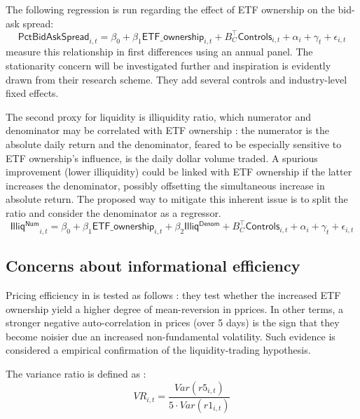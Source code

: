 The following regression is run regarding the effect of ETF ownership on the bid-ask spread:
\begin{equation}
 \mathsf{PctBidAskSpread}_{i,t} = \beta_{0} + \beta_{1} \mathsf{ETF\_ownership}_{i, t} + B_{C}^{\intercal} \mathsf{Controls}_{i, t} + \alpha_{i} + \gamma_{t} + \epsilon_{i, t}
\end{equation}
\textcite{Israeli2017} measure this relationship in first differences using an annual panel. The stationarity concern will be investigated further and inspiration is evidently drawn from their research scheme. They add several controls and industry-level fixed effects.

The second proxy for liquidity is \textcite{Amihud2002} illiquidity ratio, which numerator and denominator may be correlated with ETF ownership : the numerator is the absolute daily return and the denominator, feared to be especially sensitive to ETF ownership's influence, is the daily dollar volume traded. A spurious improvement (lower illiquidity) could be linked with ETF ownership if the latter increases the denominator, possibly offsetting the simultaneous increase in absolute return. The proposed way to mitigate this inherent issue is to split the ratio and consider the denominator as a regressor.
\begin{equation}
   \mathsf{Illiq^{Num}}_{i,t} = \beta_{0} + \beta_{1} \mathsf{ETF\_ownership}_{i, t} + \beta_{2} \mathsf{Illiq^{Denom}} + B_{C}^{\intercal} \mathsf{Controls}_{i, t} + \alpha_{i} + \gamma_{t} + \epsilon_{i, t}
\end{equation}
\subsection{Concerns about informational efficiency}
\label{subsec:Method:Efficiency}
Pricing efficiency in \textcite{Ben-David2018} is tested as follows : they test whether the increased ETF ownership yield a higher degree of mean-reversion in pprices. In other terms, a stronger negative auto-correlation in prices (over 5 days) is the sign that they become noisier due an increased non-fundamental volatility. Such evidence is considered a empirical confirmation of the liquidity-trading hypothesis.

The variance ratio is defined as :
\begin{equation}
 VR_{i,t} = \frac{Var(r5_{i, t})}{5 \cdot Var(r1_{i, t})}
  \end{equation}

